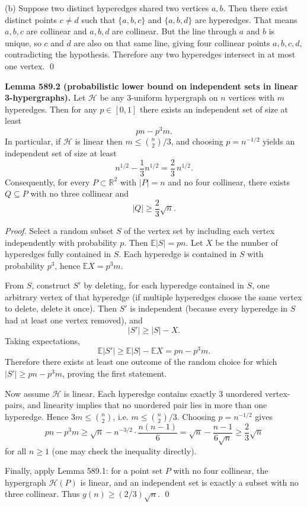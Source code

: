 (b) Suppose two distinct hyperedges shared two vertices $a,b$.
Then there exist distinct points $c\ne d$ such that $\{a,b,c\}$ and $\{a,b,d\}$ are hyperedges.
That means $a,b,c$ are collinear and $a,b,d$ are collinear.
But the line through $a$ and $b$ is unique, so $c$ and $d$ are also on that same line, giving four collinear points $a,b,c,d$, contradicting the hypothesis.
Therefore any two hyperedges intersect in at most one vertex.
\qed

\bigskip
\noindent\textbf{Lemma 589.2 (probabilistic lower bound on independent sets in linear 3-hypergraphs).}
Let $\mathcal{H}$ be any 3-uniform hypergraph on $n$ vertices with $m$ hyperedges.
Then for any $p\in[0,1]$ there exists an independent set of size at least
\[
 pn - p^3 m.
\]
In particular, if $\mathcal{H}$ is linear then $m\le \binom{n}{2}/3$, and choosing $p=n^{-1/2}$ yields an independent set of size at least
\[
 n^{1/2}-\frac{1}{3}n^{1/2}=\frac{2}{3}\,n^{1/2}.
\]
Consequently, for every $P\subset\mathbb{R}^2$ with $|P|=n$ and no four collinear, there exists $Q\subseteq P$ with no three collinear and
\[
|Q|\ge \frac{2}{3}\sqrt{n}.
\]

\noindent\emph{Proof.}
Select a random subset $S$ of the vertex set by including each vertex independently with probability $p$.
Then $\mathbb{E}|S|=pn$.
Let $X$ be the number of hyperedges fully contained in $S$.
Each hyperedge is contained in $S$ with probability $p^3$, hence $\mathbb{E}X=p^3 m$.

From $S$, construct $S'$ by deleting, for each hyperedge contained in $S$, one arbitrary vertex of that hyperedge (if multiple hyperedges choose the same vertex to delete, delete it once).
Then $S'$ is independent (because every hyperedge in $S$ had at least one vertex removed), and
\[
|S'|\ge |S|-X.
\]
Taking expectations,
\[
\mathbb{E}|S'|\ge \mathbb{E}|S|-\mathbb{E}X = pn - p^3 m.
\]
Therefore there exists at least one outcome of the random choice for which $|S'|\ge pn-p^3 m$, proving the first statement.

Now assume $\mathcal{H}$ is linear.
Each hyperedge contains exactly $3$ unordered vertex-pairs, and linearity implies that no unordered pair lies in more than one hyperedge.
Hence $3m\le \binom{n}{2}$, i.e. $m\le \binom{n}{2}/3$.
Choosing $p=n^{-1/2}$ gives
\[
 pn-p^3 m \ge \sqrt n - n^{-3/2}\cdot \frac{n(n-1)}{6} = \sqrt n - \frac{n-1}{6\sqrt n} \ge \frac{2}{3}\sqrt n
\]
for all $n\ge 1$ (one may check the inequality directly).

Finally, apply Lemma 589.1: for a point set $P$ with no four collinear, the hypergraph $\mathcal{H}(P)$ is linear, and an independent set is exactly a subset with no three collinear.
Thus $g(n)\ge (2/3)\sqrt n$.
\qed

